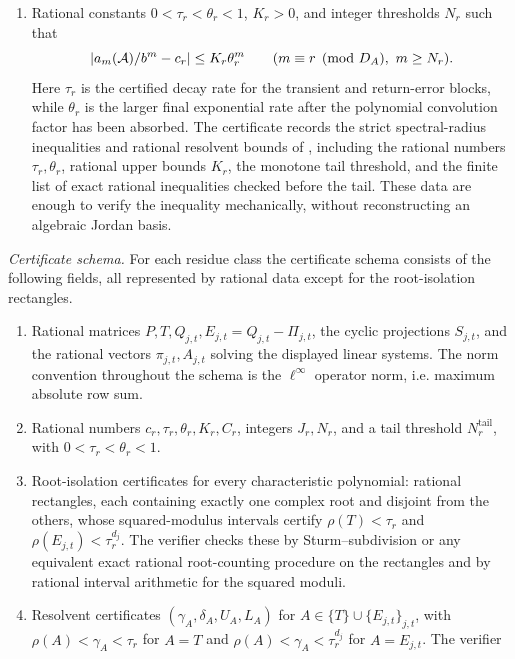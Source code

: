 \begin{theorem}
\begin{enumerate}[label=\textup{(\alph*)}]
    \item Rational constants \(0<\tau_r<\theta_r<1\), \(K_r>0\), and
    integer thresholds \(N_r\) such that
    \[
      \lvert a_m(\mathcal A)/b^m-c_r \rvert\le K_r\theta_r^m
      \qquad(m\equiv r\pmod {D_A},\ m\ge N_r).
    \]
    Here \(\tau_r\) is the certified decay rate for the transient and
    return-error blocks, while \(\theta_r\) is the larger final
    exponential rate after the polynomial convolution factor has been
    absorbed. The certificate records the strict spectral-radius
    inequalities and rational resolvent bounds of
    , including the rational
    numbers \(\tau_r,\theta_r\), rational upper bounds \(K_r\), the
    monotone tail threshold, and the finite list of exact rational
    inequalities checked before the tail. These data are enough to
    verify the inequality mechanically, without reconstructing an
    algebraic Jordan basis.
  \end{enumerate}
  \smallskip
  \noindent\textit{Certificate schema.}
  For each residue class the certificate schema consists of the
  following fields, all represented by rational data except for the
  root-isolation rectangles.
  \begin{enumerate}[label=\textup{(\roman*)}]
    \item Rational matrices \(P,T,Q_{j,t},E_{j,t}=Q_{j,t}-\Pi_{j,t}\),
    the cyclic projections \(S_{j,t}\), and the rational vectors
    \(\pi_{j,t},A_{j,t}\) solving the displayed linear systems.
    The norm convention throughout the schema is the
    \(\ell^\infty\) operator norm, i.e. maximum absolute row sum.
    \item Rational numbers \(c_r,\tau_r,\theta_r,K_r,C_r\), integers
    \(J_r,N_r\), and a tail threshold \(N_r^{\mathrm{tail}}\), with
    \(0<\tau_r<\theta_r<1\).
    \item Root-isolation certificates for every characteristic
    polynomial: rational rectangles, each containing exactly one complex
    root and disjoint from the others, whose squared-modulus intervals
    certify \(\rho(T)<\tau_r\) and
    \(\rho(E_{j,t})<\tau_r^{d_j}\). The verifier checks these by
    Sturm--subdivision or any equivalent exact rational root-counting
    procedure on the rectangles and by rational interval arithmetic for
    the squared moduli.
    \item Resolvent certificates
    \((\gamma_A,\delta_A,U_A,L_A)\) for
    \(A\in\{T\}\cup\{E_{j,t}\}_{j,t}\), with
    \(\rho(A)<\gamma_A<\tau_r\) for \(A=T\) and
    \(\rho(A)<\gamma_A<\tau_r^{d_j}\) for \(A=E_{j,t}\). The verifier

\end{enumerate}
\end{theorem}
